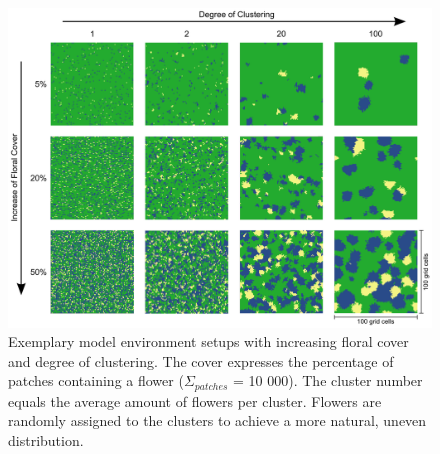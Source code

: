 \begin{figure} [!h] %
	\centering
	\includegraphics[width=15cm]{Images/cluster}
	\caption{ Exemplary model environment setups with increasing floral cover and degree of clustering. The cover expresses the percentage of patches containing a flower ($\Sigma_{patches}$ = 10 000). The cluster number equals the average amount of flowers per cluster. Flowers are randomly assigned to the clusters to achieve a more natural, uneven distribution. }
	\label{fig:cluster}
\end{figure}

